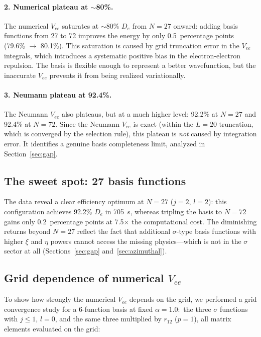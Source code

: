 \documentclass[aps,pra,twocolumn,superscriptaddress,longbibliography]{revtex4-2}
\begin{document}
\paragraph{2. Numerical plateau at $\sim$80\%.}
The numerical $V_{ee}$ saturates at $\sim$80\% $D_e$ from
$N = 27$ onward: adding basis functions from 27 to 72 improves
the energy by only 0.5~percentage points (79.6\% $\to$ 80.1\%).
This saturation is caused by grid truncation error in the
$V_{ee}$ integrals, which introduces a systematic positive bias
in the electron-electron repulsion.  The basis is flexible
enough to represent a better wavefunction, but the inaccurate
$V_{ee}$ prevents it from being realized variationally.

\paragraph{3. Neumann plateau at 92.4\%.}
The Neumann $V_{ee}$ also plateaus, but at a much higher
level: 92.2\% at $N = 27$ and 92.4\% at $N = 72$.  Since the
Neumann $V_{ee}$ is exact (within the $L = 20$ truncation,
which is converged by the selection rule), this plateau is
\emph{not} caused by integration error.  It identifies a genuine
basis completeness limit, analyzed in Section~\ref{sec:gap}.

\subsection{The sweet spot: 27 basis functions}

The data reveal a clear efficiency optimum at $N = 27$
($j = 2$, $l = 2$): this configuration achieves 92.2\% $D_e$
in 705~s, whereas tripling the basis to $N = 72$ gains only
0.2~percentage points at 7.5$\times$ the computational cost.
The diminishing returns beyond $N = 27$ reflect the fact that
additional $\sigma$-type basis functions with higher $\xi$
and $\eta$ powers cannot access the missing physics---which is
not in the $\sigma$ sector at all
(Sections~\ref{sec:gap} and~\ref{sec:azimuthal}).

\subsection{Grid dependence of numerical \texorpdfstring{$V_{ee}$}{Vee}}

To show how strongly the numerical $V_{ee}$ depends on the grid, we
performed a grid convergence study for a 6-function basis at fixed
$\alpha = 1.0$:\ the three $\sigma$ functions with $j \le 1$, $l = 0$,
and the same three multiplied by $r_{12}$ ($p = 1$), all matrix
elements evaluated on the grid:
\end{document}
